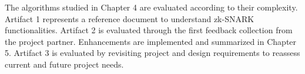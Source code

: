 The algorithms studied in Chapter 4 are evaluated according to their complexity. Artifact 1 represents a reference document to understand zk-SNARK functionalities. Artifact 2 is evaluated through the first feedback collection from the project partner. Enhancements are implemented and summarized in Chapter 5. Artifact 3 is evaluated by revisiting project and design requirements to reassess current and future project needs.